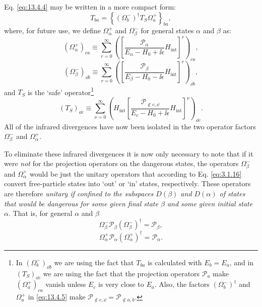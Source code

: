 Eq. \eqref{eq:13.4.4} may be written in a more compact form:
\begin{equation}
T_{ba}=\left\{(\Omega_b^-)^\dagger T_S\Omega_a^+\right\}_{ba},
\tag{13.4.5}\label{eq:13.4.5}
\end{equation}
where, for future use, we define $\Omega_\alpha^+$ and $\Omega_\beta^-$ for
general states $\alpha$ and $\beta$ as:
\begin{equation}
(\Omega_\alpha^+)_{ca}\equiv
\sum_{r=0}^{\infty}
\left(\left[\frac{\mathcal P_\alpha}{E_\alpha-H_0+\ii\epsilon}
H_{\mathrm{int}}\right]^r\right)_{ca},
\tag{13.4.6}\label{eq:13.4.6}
\end{equation}
\begin{equation}
(\Omega_\beta^-)_{\dd b}\equiv
\sum_{r=0}^{\infty}
\left(\left[\frac{\mathcal P_\beta}{E_\beta-H_0-\ii\epsilon}
H_{\mathrm{int}}\right]^r\right)_{\dd b},
\tag{13.4.7}\label{eq:13.4.7}
\end{equation}
and $T_S$ is the `safe' operator\footnote{In $(\Omega_b^-)_{\dd b}$ we are using
the fact that $T_{ba}$ is calculated with $E_b=E_a$, and in $(T_S)_{\dd c}$ we
are using the fact that the projection operators $\mathcal P_a$ make
$(\Omega_a^+)_{ca}$ vanish unless $E_c$ is very close to $E_a$. Also, the
factors $(\Omega_b^-)^\dagger$ and $\Omega_a^+$ in
\eqref{eq:13.4.5} make
$\mathcal P_{\notin c,\dd}=\mathcal P_{\notin a,b}$.}
\begin{equation}
(T_S)_{\dd c}\equiv\sum_{\nu=0}^{\infty}
\left(H_{\mathrm{int}}
\left[\frac{\mathcal P_{\notin c,\dd}}{E_c-H_0+\ii\epsilon}
H_{\mathrm{int}}\right]^\nu\right)_{\dd c}.
\tag{13.4.8}\label{eq:13.4.8}
\end{equation}
All of the infrared divergences have now been isolated in the two operator
factors $\Omega_\beta^-$ and $\Omega_\alpha^+$.

To eliminate these infrared divergences it is now only necessary to note that
if it were \emph{not} for the projection operators on the dangerous states,
the operators $\Omega_\beta^-$ and $\Omega_\alpha^+$ would be just the unitary
operators that according to Eq. \eqref{eq:3.1.16} convert free-particle states
into `out' or `in' states, respectively. These operators are therefore
\emph{unitary if confined to the subspaces $D(\beta)$ and $D(\alpha)$ of
states that would be dangerous for some given final state $\beta$ and some
given initial state $\alpha$}. That is, for general $\alpha$ and $\beta$
\begin{equation}
\Omega_\beta^-\mathcal P_\beta(\Omega_\beta^-)^\dagger
=\mathcal P_\beta,
\tag{13.4.9}\label{eq:13.4.9}
\end{equation}
\begin{equation}
\Omega_\alpha^+\mathcal P_\alpha(\Omega_\alpha^+)^\dagger
=\mathcal P_\alpha.
\tag{13.4.10}\label{eq:13.4.10}
\end{equation}


